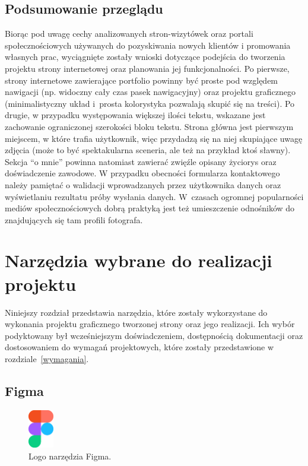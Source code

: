 \documentclass[a4paper, 12pt]{article}
\numberwithin{figure}{section}
\begin{document}
\begin{sloppypar}
\subsection{Podsumowanie przeglądu}

Biorąc pod uwagę cechy analizowanych stron-wizytówek oraz portali społecznościowych używanych do pozyskiwania nowych klientów i promowania własnych prac, wyciągnięte zostały wnioski dotyczące podejścia do tworzenia projektu strony internetowej oraz planowania jej funkcjonalności. Po pierwsze, strony internetowe zawierające portfolio powinny być proste pod względem nawigacji (np. widoczny cały czas pasek nawigacyjny) oraz projektu graficznego (minimalistyczny układ i~prosta kolorystyka pozwalają skupić się na treści). Po drugie, w przypadku występowania większej ilości tekstu, wskazane jest zachowanie ograniczonej szerokości bloku tekstu. Strona główna jest pierwszym miejscem, w które trafia użytkownik, więc przydadzą się na niej skupiające uwagę zdjęcia (może to być spektakularna sceneria, ale też na przykład ktoś sławny). Sekcja ``o mnie'' powinna natomiast zawierać zwięźle opisany życiorys oraz doświadczenie zawodowe. W przypadku obecności formularza kontaktowego należy pamiętać o walidacji wprowadzanych przez użytkownika danych oraz wyświetlaniu rezultatu próby wysłania danych. W~czasach ogromnej popularności mediów społecznościowych dobrą praktyką jest też umieszczenie odnośników do znajdujących się tam profili fotografa.


\newpage 

\section{Narzędzia wybrane do realizacji projektu}

Niniejszy rozdział przedstawia narzędzia, które zostały wykorzystane do wykonania projektu graficznego tworzonej strony oraz jego realizacji. Ich wybór podyktowany był wcześniejszym doświadczeniem, dostępnością dokumentacji oraz dostosowaniem do wymagań projektowych, które zostały przedstawione w rozdziale~\ref{wymagania}.

\subsection*{Figma}

\begin{figure}[H] 
    \centering
        \includegraphics[width=0.1\textwidth]{images/figma-logo.png}
   \caption{Logo narzędzia Figma.}
\end{figure}



\end{sloppypar}
\end{document}

